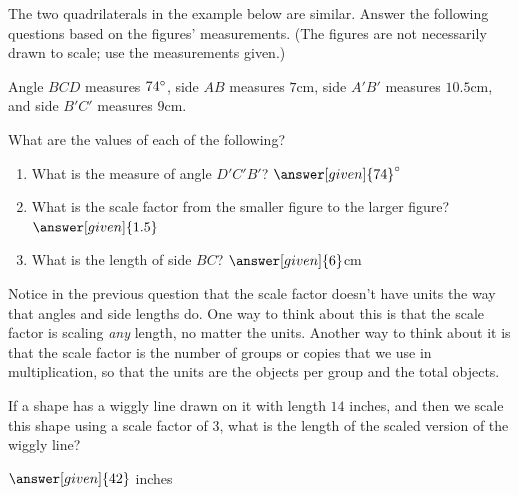 \documentclass{ximera}
\begin{document}
\begin{example}
The two quadrilaterals in the example below are similar. Answer the following questions based on the figures' measurements. (The figures are not necessarily drawn to scale; use the measurements given.)
\begin{image}
\end{image}
Angle $BCD$ measures $74\degree$, side $AB$ measures $7$cm, side $A'B'$ measures $10.5$cm, and side $B'C'$ measures $9$cm.

\begin{question}
What are the values of each of the following?
\begin{enumerate}
\item What is the measure of angle $D'C'B'$? $\answer[given]{74}\degree$
\item What is the scale factor from the smaller figure to the larger figure? $\answer[given]{1.5}$
\item What is the length of side $BC$? $\answer[given]{6}$cm

\end{enumerate}
\end{question}
Notice in the previous question that the scale factor doesn't have units the way that angles and side lengths do. One way to think about this is that the scale factor is scaling \emph{any} length, no matter the units. Another way to think about it is that the scale factor is the number of groups or copies that we use in multiplication, so that the units are the objects per group and the total objects.

\begin{question}
If a shape has a wiggly line drawn on it with length $14$ inches, and then we scale this shape using a scale factor of 3, what is the length of the scaled version of the wiggly line?
\begin{prompt}
$\answer[given]{42}$ inches
\end{prompt}
\end{question}

\end{example}
\end{document}
